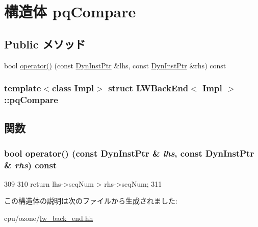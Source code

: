 \hypertarget{structLWBackEnd_1_1pqCompare}{
\section{構造体 pqCompare}
\label{structLWBackEnd_1_1pqCompare}
}
\subsection*{Public メソッド}
\begin{DoxyCompactItemize}
\item 
bool \hyperlink{structLWBackEnd_1_1pqCompare_aa171c804e811b84fcefef511a9031fb6}{operator()} (const \hyperlink{classLWBackEnd_a028ce10889c5f6450239d9e9a7347976}{DynInstPtr} \&lhs, const \hyperlink{classLWBackEnd_a028ce10889c5f6450239d9e9a7347976}{DynInstPtr} \&rhs) const 
\end{DoxyCompactItemize}
\subsubsection*{template$<$class Impl$>$ struct LWBackEnd$<$ Impl $>$::pqCompare}



\subsection{関数}
\hypertarget{structLWBackEnd_1_1pqCompare_aa171c804e811b84fcefef511a9031fb6}{
\subsubsection[{operator()}]{\setlength{\rightskip}{0pt plus 5cm}bool operator() (const {\bf DynInstPtr} \& {\em lhs}, \/  const {\bf DynInstPtr} \& {\em rhs}) const}}
\label{structLWBackEnd_1_1pqCompare_aa171c804e811b84fcefef511a9031fb6}



\begin{DoxyCode}
309         {
310             return lhs->seqNum > rhs->seqNum;
311         }
\end{DoxyCode}


この構造体の説明は次のファイルから生成されました:\begin{DoxyCompactItemize}
\item 
cpu/ozone/\hyperlink{lw__back__end_8hh}{lw\_\-back\_\-end.hh}\end{DoxyCompactItemize}
